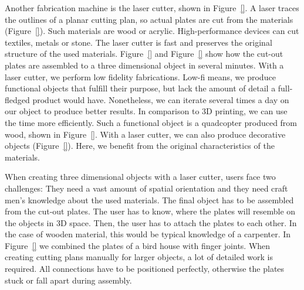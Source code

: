 \documentclass[../ClassicThesis.tex]{subfiles}
\begin{document}
Another fabrication machine is the laser cutter, shown in
Figure~\ref{}. A laser traces the outlines of a planar
cutting plan, so actual plates are cut from the materials
(Figure~\ref{}). Such materials are wood or acrylic.
High-performance devices can cut textiles, metals or stone. The laser
cutter is fast and preserves the original structure of the used
materials. Figure~\ref{} and Figure~\ref{} show how the cut-out plates
are assembled to a three dimensional object in several minutes. With a
laser cutter, we perform low fidelity fabrications. Low-fi means, we
produce functional objects that fulfill their purpose, but lack the
amount of detail a full-fledged product would have. Nonetheless, we
can iterate several times a day on our object to produce better
results. In comparison to 3D printing, we can use the time more
efficiently. Such a functional object is a quadcopter produced from
wood, shown in Figure~\ref{}. With a laser cutter, we can
also produce decorative objects (Figure~\ref{}). Here, we
benefit from the original characteristics of the materials.


When creating three dimensional objects with a laser cutter, users
face two challenges: They need a vast amount of spatial orientation
and they need craft men's knowledge about the used materials. The
final object has to be assembled from the cut-out plates. The user has
to know, where the plates will resemble on the objects in 3D space.
Then, the user has to attach the plates to each other. In the case of
wooden material, this would be typical knowledge of a carpenter. In
Figure~\ref{} we combined the plates of a bird house with
finger joints. When creating cutting plans manually for larger
objects, a lot of detailed work is required. All connections have to
be positioned perfectly, otherwise the plates stuck or fall apart
during assembly.

\end{document}
